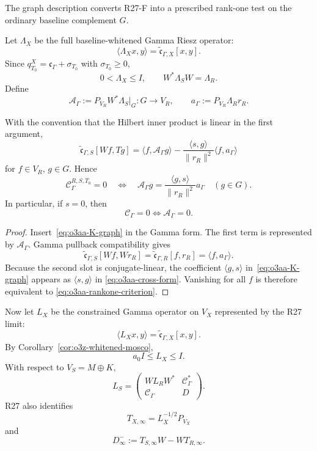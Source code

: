 The graph description converts R27-F into a prescribed rank-one test on the ordinary
baseline complement $G$.

Let $\Lambda_X$ be the full baseline-whitened Gamma Riesz operator:
\[
 \langle\Lambda_Xx,y\rangle
 =\widetilde{\mathfrak c}_{\Gamma,X}[x,y].
\]
Since $q_{T_0}^X=\mathfrak c_{\Gamma}+\sigma_{T_0}$ with $\sigma_{T_0}\ge0$,
\[
 0<\Lambda_X\le I,
 \qquad
 W^*\Lambda_SW=\Lambda_R.
\tag{O3AA.7}\label{eq:o3aa-Lambda}
\]
Define
\[
 \mathcal A_\Gamma
 :=P_{V_R}W^*\Lambda_S|_G:G\to V_R,
 \qquad
 a_\Gamma:=P_{V_R}\Lambda_Rr_R.
\tag{O3AA.8}\label{eq:o3aa-Aa}
\]

\begin{proposition}
\label{prop:o3aa-rankone}
With the convention that the Hilbert inner product is linear in the first argument,
\[
 \boxed{
 \widetilde{\mathfrak c}_{\Gamma,S}[Wf,Tg]
 =\langle f,\mathcal A_\Gamma g\rangle
 -\frac{\langle s,g\rangle}{\|r_R\|^2}
  \langle f,a_\Gamma\rangle
 }
\tag{O3AA.9}\label{eq:o3aa-cross-form}
\]
for $f\in V_R$, $g\in G$.  Hence
\[
 \boxed{
 \mathscr C_\Gamma^{R,S,T_0}=0
 \quad\Longleftrightarrow\quad
 \mathcal A_\Gamma g
 =\frac{\langle g,s\rangle}{\|r_R\|^2}a_\Gamma
 \quad(g\in G).
 }
\tag{O3AA.10}\label{eq:o3aa-rankone-criterion}
\]
In particular, if $s=0$, then
\[
 \mathscr C_\Gamma=0\iff\mathcal A_\Gamma=0.
\tag{O3AA.11}\label{eq:o3aa-rankone-szero}
\]
\end{proposition}

\begin{proof}
Insert~\eqref{eq:o3aa-K-graph} in the Gamma form.  The first term is represented by
$\mathcal A_\Gamma$.  Gamma pullback compatibility gives
\[
 \widetilde{\mathfrak c}_{\Gamma,S}[Wf,Wr_R]
 =\widetilde{\mathfrak c}_{\Gamma,R}[f,r_R]
 =\langle f,a_\Gamma\rangle.
\]
Because the second slot is conjugate-linear, the coefficient
$\langle g,s\rangle$ in~\eqref{eq:o3aa-K-graph} appears as $\langle s,g\rangle$ in
\eqref{eq:o3aa-cross-form}.  Vanishing for all $f$ is therefore equivalent to
\eqref{eq:o3aa-rankone-criterion}.
\end{proof}

Now let $L_X$ be the constrained Gamma operator on $V_X$ represented by the R27 limit:
\[
 \langle L_Xx,y\rangle
 =\widetilde{\mathfrak c}_{\Gamma,X}[x,y].
\]
By Corollary~\ref{cor:o3z-whitened-mosco},
\[
 a_0I\le L_X\le I.
\tag{O3AA.12}\label{eq:o3aa-L-bounds}
\]
With respect to $V_S=M\oplus K$,
\[
 \boxed{
 L_S=
 \begin{pmatrix}
 WL_RW^*&\mathscr C_\Gamma^*\\
 \mathscr C_\Gamma&D
 \end{pmatrix}.
 }
\tag{O3AA.13}\label{eq:o3aa-L-block}
\]
R27 also identifies
\[
 T_{X,\infty}=L_X^{-1/2}P_{V_X}
\tag{O3AA.14}\label{eq:o3aa-T-limit}
\]
and
\[
 D_\infty^-:=T_{S,\infty}W-WT_{R,\infty}.
\tag{O3AA.15}\label{eq:o3aa-Dinf}
\]


